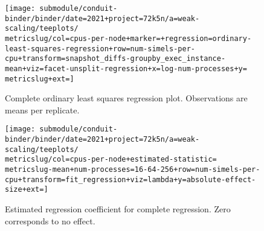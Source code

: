 \begin{figure*}[h]
  \centering

  \begin{subfigure}[b]{0.49\textwidth}
    \centering
    \texttt{[image: submodule/conduit-binder/binder/date=2021+project=72k5n/a=weak-scaling/teeplots/\\metricslug/col=cpus-per-node+marker=+regression=ordinary-least-squares-regression+row=num-simels-per-cpu+transform=snapshot\_diffs-groupby\_exec\_instance-mean+viz=facet-unsplit-regression+x=log-num-processes+y=\\metricslug+ext=]}
    \caption{
      Complete ordinary least squares regression plot.
      Observations are means per replicate.
    }
    \label{fig:weak-scaling-regression-ols-\metricslug-complete-regression}
  \end{subfigure}%
  \hfill%
  \begin{subfigure}[b]{0.49\textwidth}
    \centering
    \texttt{[image: submodule/conduit-binder/binder/date=2021+project=72k5n/a=weak-scaling/teeplots/\\metricslug/col=cpus-per-node+estimated-statistic=\\metricslug-mean+num-processes=16-64-256+row=num-simels-per-cpu+transform=fit\_regression+viz=lambda+y=absolute-effect-size+ext=]}
    \caption{Estimated regression coefficient for complete regression. Zero corresponds to no effect.}
    \label{fig:weak-scaling-regression-ols-\metricslug-complete-effect-size}
  \end{subfigure}


\end{figure*}
